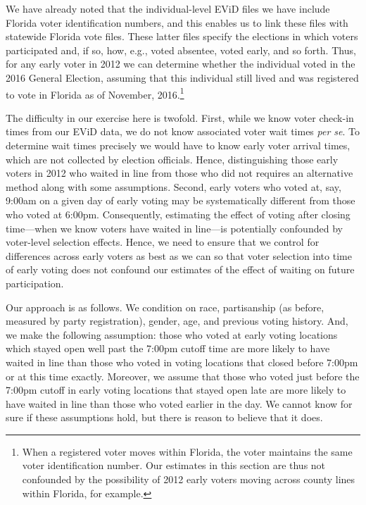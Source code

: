 \documentclass[12pt,titlepage]{article}
\begin{document}
We have already noted that the individual-level EViD files we have
include Florida voter identification numbers, and this enables us to
link these files with statewide Florida vote files.  These latter
files specify the elections in which voters participated and, if so,
how, e.g., voted absentee, voted early, and so forth.  Thus, for any
early voter in 2012 we can determine whether the individual voted in
the 2016 General Election, assuming that this individual still lived
and was registered to vote in Florida as of November,
2016.\footnote{When a registered voter moves within Florida, the voter
  maintains the same voter identification number.  Our estimates in
  this section are thus not confounded by the possibility of 2012
  early voters moving across county lines within Florida, for
  example.}

The difficulty in our exercise here is twofold.  First, while we know
voter check-in times from our EViD data, we do not know associated
voter wait times \emph{per se}.  To determine wait times precisely we
would have to know early voter arrival times, which are not collected
by election officials.  Hence, distinguishing those early voters in
2012 who waited in line from those who did not requires an alternative
method along with some assumptions.  Second, early voters who voted
at, say, 9:00am on a given day of early voting may be systematically
different from those who voted at 6:00pm. Consequently, estimating the
effect of voting after closing time---when we know voters have waited
in line---is potentially confounded by voter-level selection effects.
Hence, we need to ensure that we control for differences across early
voters as best as we can so that voter selection into time of early
voting does not confound our estimates of the effect of waiting on
future participation.

Our approach is as follows.  We condition on race, partisanship (as
before, measured by party registration), gender, age, and previous
voting history.  And, we make the following assumption: those who
voted at early voting locations which stayed open well past the 7:00pm
cutoff time are more likely to have waited in line than those who
voted in voting locations that closed before 7:00pm or at this time
exactly.  Moreover, we assume that those who voted just before the
7:00pm cutoff in early voting locations that stayed open late are more
likely to have waited in line than those who voted earlier in the day.
We cannot know for sure if these assumptions hold, but there is reason
to believe that it does.
\end{document}
